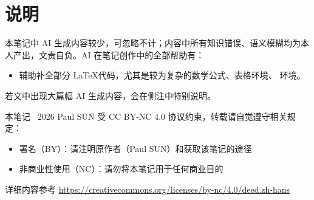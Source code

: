 \cleardoublepage
\pagestyle{symplain}
\thispagestyle{symplain}

\chapter*{说明}
\vspace{\baselineskip}


本笔记中 AI 生成内容较少，可忽略不计；内容中所有知识错误、语义模糊均为本人产出，文责自负。AI 在笔记创作中的全部帮助有：
\begin{itemize}
    \item 辅助补全部分 \LaTeX 代码，尤其是较为复杂的数学公式、表格环境、 环境。
\end{itemize}
若文中出现大篇幅 AI 生成内容，会在侧注中特别说明。

\myskip
{}

本笔记 \textcopyright\ 2026 Paul SUN 受 CC BY-NC 4.0 协议约束，转载请自觉遵守相关规定：
\begin{itemize}
    \item 署名（BY）：请注明原作者（Paul SUN）和获取该笔记的途径
    \item 非商业性使用（NC）：请勿将本笔记用于任何商业目的
\end{itemize}
详细内容参考 \url{https://creativecommons.org/licenses/by-nc/4.0/deed.zh-hans}

\clearpage
\pagestyle{symplain}
